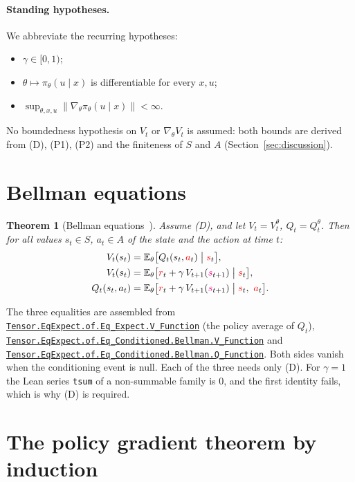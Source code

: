 \documentclass[11pt,a4paper]{article}
\newcommand{\lmod}[1]{\href{http://www.lemma.cn/lean/?module=#1}{\nolinkurl{#1}}}
\newtheorem{theorem}{Theorem}[section]
\newcommand{\E}{\mathbb{E}}
\newcommand{\rv}[1]{{\color{red}#1}}       %
\newcommand{\ra}[1]{{\color{magenta}#1}}   %
\newcommand{\sv}{\rv{s}}
\newcommand{\av}{\rv{a}}
\newcommand{\rw}{\rv{r}}
\newcommand{\grad}{\nabla_{\theta}}
\begin{document}
\paragraph{Standing hypotheses.}
We abbreviate the recurring hypotheses:
\begin{itemize}[leftmargin=1.6em,itemsep=0.1em]
  \item[(D)] $\gamma\in[0,1)$;
  \item[(P1)] $\theta\mapsto\pi_\theta(u\mid x)$ is differentiable for every $x,u$;
  \item[(P2)] $\sup_{\theta,x,u}\|\grad\pi_\theta(u\mid x)\|<\infty$.
\end{itemize}
No boundedness hypothesis on $V_t$ or $\grad V_t$ is assumed: both bounds are derived from (D), (P1), (P2) and the finiteness of $S$ and $A$ (Section~\ref{sec:discussion}).

\section{Bellman equations}
\label{sec:bellman}

\begin{theorem}[Bellman equations~\cite{lemma_bellman}]
\label{thm:bellman}
Assume (D), and let $V_t=V_t^\theta$, $Q_t=Q_t^\theta$.
Then for all values $s_t\in S$, $a_t\in A$ of the state and the action at time $t$:
\begin{align*}
V_t(s_t)&=\E_\theta\bigl[Q_t(s_t,\av_t)\bigm|\sv_t\bigr],\\
V_t(s_t)&=\E_\theta\bigl[\rw_t+\gamma\,V_{t+1}(\ra{s}_{t+1})\bigm|\sv_t\bigr],\\
Q_t(s_t,a_t)&=\E_\theta\bigl[\rw_t+\gamma\,V_{t+1}(\ra{s}_{t+1})\bigm|\sv_t,\ \av_t\bigr].
\end{align*}
\end{theorem}
The three equalities are assembled from
\lmod{Tensor.EqExpect.of.Eq_Expect.V_Function} (the policy average of $Q_t$),
\lmod{Tensor.EqExpect.of.Eq_Conditioned.Bellman.V_Function} and
\lmod{Tensor.EqExpect.of.Eq_Conditioned.Bellman.Q_Function}.
Both sides vanish when the conditioning event is null.
Each of the three needs only (D).
For $\gamma=1$ the Lean series \texttt{tsum} of a non-summable family is $0$, and the first identity fails, which is why (D) is required.

\section{The policy gradient theorem by induction}
\label{sec:induct}
\end{document}
